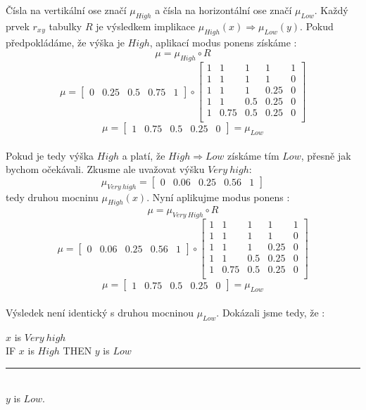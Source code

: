 \documentclass[
  program=inf,
  figures,
  tables,
  glossaries,
  index
]{kidiplom}
\begin{document}
Čísla na vertikální ose značí $\mu_{High}$ a čísla na horizontální ose značí $\mu_{Low}$. Každý prvek $r_{x\hspace{1pt} y}$ tabulky $R$ je výsledkem implikace $\mu_{High}(x) \Rightarrow \mu_{Low}(y)$. Pokud předpokládáme, že výška je $High$, aplikací modus ponens získáme \cite{bFoFC}:
\[\mu = \mu_{High}\circ R \]
\[\mu = \begin{bmatrix}0 & 0.25 & 0.5 & 0.75 & 1\end{bmatrix} \circ
\begin{bmatrix} 
	1 & 1 & 1 & 1 & 1 \\
	1 & 1 & 1 & 1 & 0 \\
	1 & 1 & 1 & 0.25 & 0 \\
	1 & 1 & 0.5 & 0.25 & 0 \\
	1 & 0.75 & 0.5 & 0.25 & 0 \\
	\end{bmatrix}
\]
\[\mu = \begin{bmatrix}1 & 0.75 & 0.5 & 0.25 & 0\end{bmatrix} = \mu_{Low}\] \\
Pokud je tedy výška $High$ a platí, že $High \Rightarrow Low$ získáme tím $Low$, přesně jak bychom očekávali. Zkusme ale uvažovat výšku $Very \: high$: \[\mu_{Very \: high} = \begin{bmatrix}0 & 0.06 & 0.25 & 0.56 & 1\end{bmatrix}\]
tedy druhou mocninu $\mu_{High}(x)$. Nyní aplikujme modus ponens \cite{bFoFC}: 
\[\mu = \mu_{Very \: High}\circ R \]
\[\mu = \begin{bmatrix}0 & 0.06 & 0.25 & 0.56 & 1\end{bmatrix} \circ
\begin{bmatrix} 
	1 & 1 & 1 & 1 & 1 \\
	1 & 1 & 1 & 1 & 0 \\
	1 & 1 & 1 & 0.25 & 0 \\
	1 & 1 & 0.5 & 0.25 & 0 \\
	1 & 0.75 & 0.5 & 0.25 & 0 \\
	\end{bmatrix}
\]
\[\mu = \begin{bmatrix}1 & 0.75 & 0.5 & 0.25 & 0\end{bmatrix} = \mu_{Low}\]\\
Výsledek není identický s druhou mocninou $\mu_{Low}$. Dokázali jsme tedy, že \cite{bFoFC}: 
\begin{center}
$x$ is $Very \: high$\\
IF $x$ is $High$ THEN $y$ is $Low$ \\
\vspace{-6pt}
\rule{160pt}{1pt} \\
$y$ is $Low$.
\end{center}
\end{document}
